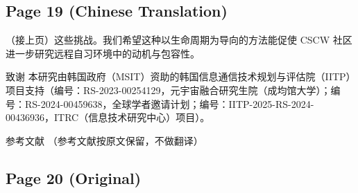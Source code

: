 \documentclass[12pt]{ctexart}
\begin{document}
\subsection*{Page 19 (Chinese Translation)}

（接上页）这些挑战。我们希望这种以生命周期为导向的方法能促使 CSCW 社区进一步研究远程自习环境中的动机与包容性。

致谢
本研究由韩国政府（MSIT）资助的韩国信息通信技术规划与评估院（IITP）项目支持（编号：RS-2023-00254129，元宇宙融合研究生院（成均馆大学）；编号：RS-2024-00459638，全球学者邀请计划；编号：IITP-2025-RS-2024-00436936，ITRC（信息技术研究中心）项目）。

参考文献
（参考文献按原文保留，不做翻译）


\subsection*{Page 20 (Original)}
\end{document}
